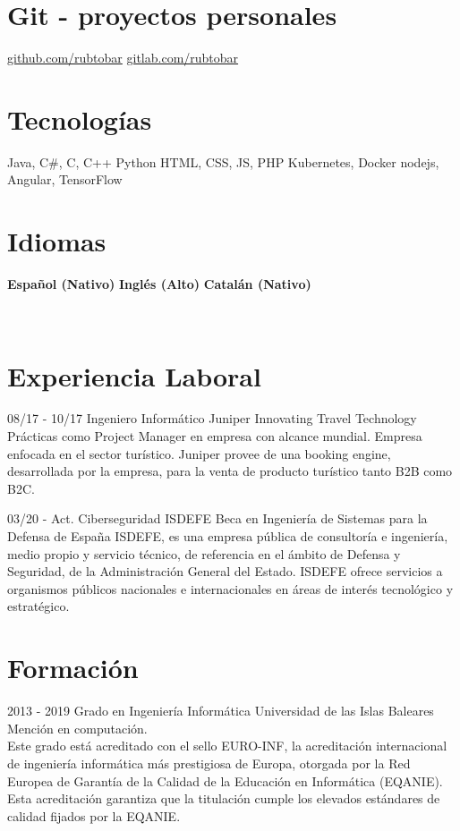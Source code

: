 \documentclass[]{friggeri-cv}
\begin{document}
\begin{aside}
  \section{Git - proyectos personales}
    \href{https://github.com/rubtobar}{github.com/rubtobar}
    \href{https://gitlab.com/rubtobar}{gitlab.com/rubtobar}
    ~
  \section{Tecnologías}
        Java, C\#, C, C++
        Python
        HTML, CSS, JS, PHP
        Kubernetes, Docker
        nodejs, Angular, TensorFlow
    ~
    \section{Idiomas}
     \textbf{Español (Nativo)}
     \textbf{Inglés (Alto)}
     \textbf{Catalán (Nativo)}
    ~
\end{aside}
~
\section{Experiencia Laboral}
\begin{entrylist}
  \entry
    {08/17 - 10/17}
    {Ingeniero Informático}
    {Juniper Innovating Travel Technology}
    {Prácticas como Project Manager en empresa con alcance mundial. Empresa enfocada en el sector turístico. Juniper provee de una booking engine, desarrollada por la empresa, para la venta de producto turístico tanto B2B como B2C.}
\end{entrylist}

\begin{entrylist}
  \entry
    {03/20 - Act. }
    {Ciberseguridad ISDEFE}
    {Beca en Ingeniería de Sistemas para la Defensa de España}
    {ISDEFE, es una empresa pública de consultoría e ingeniería, medio propio y servicio técnico, de referencia en el ámbito de Defensa y Seguridad, de la Administración General del Estado. ISDEFE ofrece servicios a organismos públicos nacionales e internacionales en áreas de interés tecnológico y estratégico.}
\end{entrylist}

\section{Formación}
\begin{entrylist}
  \entry
    {2013 - 2019}
    {Grado en Ingeniería Informática}
    {Universidad de las Islas Baleares}
    {
    Mención en computación. \\
    Este grado está acreditado con el sello EURO-INF, la acreditación internacional de ingeniería informática más prestigiosa de Europa, otorgada por la Red Europea de Garantía de la Calidad de la Educación en Informática (EQANIE). Esta acreditación garantiza que la titulación cumple los elevados estándares de calidad fijados por la EQANIE.}
\end{entrylist}
\end{document}
